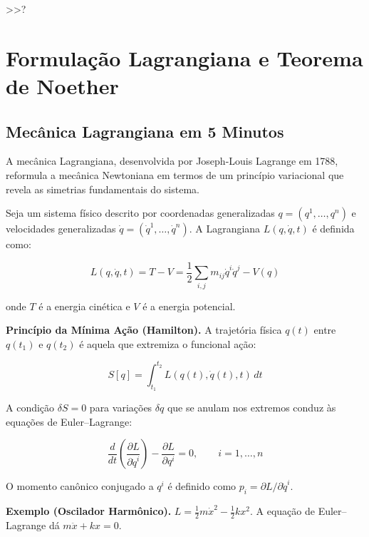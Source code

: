  >>?\chapter{Formula\c{c}\~ao Lagrangiana e Teorema de Noether}

\section{Mec\^anica Lagrangiana em 5 Minutos}

A mec\^anica Lagrangiana, desenvolvida por Joseph-Louis Lagrange em 1788, reformula a mec\^anica Newtoniana em termos de um princ\'ipio variacional que revela as simetrias fundamentais do sistema.

Seja um sistema f\'isico descrito por coordenadas generalizadas $q = (q^1,\dots,q^n)$ e velocidades generalizadas $\dot{q} = (\dot{q}^1,\dots,\dot{q}^n)$. A Lagrangiana $L(q,\dot{q},t)$ \'e definida como:

\begin{equation}\label{eq:lagrangiana-classica}
L(q,\dot{q},t) = T - V = \frac{1}{2}\sum_{i,j} m_{ij}\dot{q}^i\dot{q}^j - V(q)
\end{equation}

onde $T$ \'e a energia cin\'etica e $V$ \'e a energia potencial.

\smallskip
\noindent\textbf{Princ\'ipio da M\'inima A\c{c}\~ao (Hamilton).} A trajet\'oria f\'isica $q(t)$ entre $q(t_1)$ e $q(t_2)$ \'e aquela que extremiza o funcional a\c{c}\~ao:

\begin{equation}\label{eq:acao}
S[q] = \int_{t_1}^{t_2} L(q(t), \dot{q}(t), t) \, dt
\end{equation}

A condi\c{c}\~ao $\delta S = 0$ para varia\c{c}\~oes $\delta q$ que se anulam nos extremos conduz \`as equa\c{c}\~oes de Euler--Lagrange:

\begin{equation}\label{eq:euler-lagrange}
\frac{d}{dt}\left(\frac{\partial L}{\partial \dot{q}^i}\right) - \frac{\partial L}{\partial q^i} = 0, \qquad i = 1,\dots,n
\end{equation}

O momento can\^onico conjugado a $q^i$ \'e definido como $p_i = \partial L/\partial \dot{q}^i$.

\smallskip
\noindent\textbf{Exemplo (Oscilador Harm\^onico).} $L = \frac{1}{2}m\dot{x}^2 - \frac{1}{2}kx^2$. A equa\c{c}\~ao de Euler--Lagrange d\'a $m\ddot{x} + kx = 0$.

